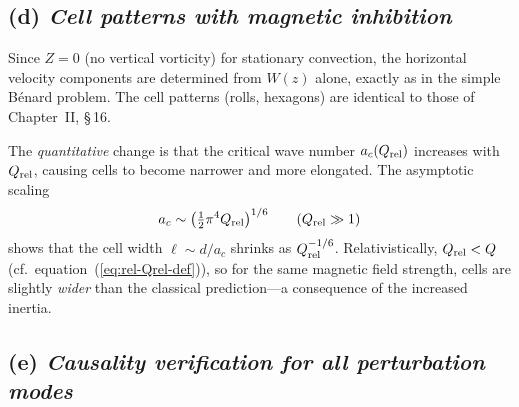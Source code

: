 \subsection*{(d) \emph{Cell patterns with magnetic inhibition}}

Since $Z=0$ (no vertical vorticity) for stationary convection, the
horizontal velocity components are determined from $W(z)$ alone,
exactly as in the simple B\'enard problem.  The cell patterns
(rolls, hexagons) are identical to those of Chapter~II, \S\,16.

The \emph{quantitative} change is that the critical wave number
$a_{c}(Q_{\mathrm{rel}})$ increases with $Q_{\mathrm{rel}}$, causing cells to become
narrower and more elongated.  The asymptotic scaling
\begin{equation}\label{eq:rel-acrit}
  a_{c} \sim \bigl(\tfrac{1}{2}\pi^{4}Q_{\mathrm{rel}}\bigr)^{1/6}
  \qquad (Q_{\mathrm{rel}}\gg 1)
\end{equation}
shows that the cell width $\ell\sim d/a_{c}$ shrinks as
$Q_{\mathrm{rel}}^{-1/6}$.  Relativistically, $Q_{\mathrm{rel}}<Q$ (cf.\
equation~(\ref{eq:rel-Qrel-def})), so for the same magnetic
field strength, cells are slightly \emph{wider} than the
classical prediction---a consequence of the increased inertia.

\subsection*{(e) \emph{Causality verification for all perturbation
  modes}}

